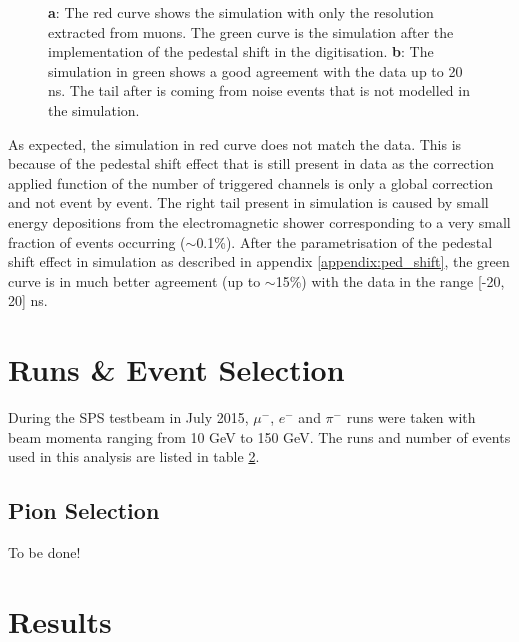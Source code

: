 \documentclass[twoside,a4paper,11pt]{article}
\begin{document}
\begin{figure}[htbp]
	\caption[]{\textbf{a}: The red curve shows the simulation with only the resolution extracted from muons. The green curve is the simulation after the implementation of the pedestal shift in the digitisation. \textbf{b}: The simulation in green shows a good agreement with the data up to 20 ns. The tail after is coming from noise events that is not modelled in the simulation.}
	\label{fig:sim_data_elec}
\end{figure}
As expected, the simulation in red curve does not match the data. This is because of the pedestal shift effect that is still present in data as the correction applied function of the number of triggered channels is only a global correction and not event by event. The right tail present in simulation is caused by small energy depositions from the electromagnetic shower corresponding to a very small fraction of events occurring ($\sim$0.1\%).
After the parametrisation of the pedestal shift effect in simulation as described in appendix \ref{appendix:ped_shift}, the green curve is in much better agreement (up to $\sim$15\%) with the data in the range [-20, 20] ns.

\section{Runs \& Event Selection}
 
During the SPS testbeam in July 2015, $\mu^-$, $e^-$ and $\pi^-$ runs were taken with beam momenta ranging from 10 GeV to 150 GeV. 
The runs and number of events used in this analysis are listed in table \ref{}.

\subsection{Pion Selection}

To be done!

\section{Results}
\end{document}

